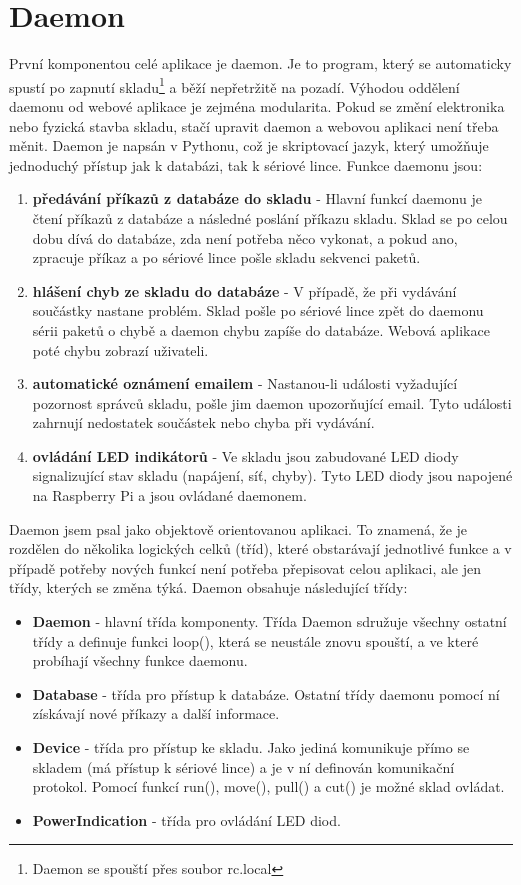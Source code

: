 \documentclass[12pt, a4paper, oneside]{article}
\begin{document}
\section{Daemon}

První komponentou celé aplikace je daemon. Je to program, který se automaticky spustí po zapnutí skladu\footnote{Daemon se spouští přes soubor rc.local} a běží nepřetržitě na pozadí. Výhodou oddělení daemonu od webové aplikace je zejména modularita. Pokud se změní elektronika nebo fyzická stavba skladu, stačí upravit daemon a webovou aplikaci není třeba měnit. Daemon je napsán v Pythonu, což je skriptovací jazyk, který umožňuje jednoduchý přístup jak k databázi, tak k sériové lince. Funkce daemonu jsou:

\begin{enumerate}
\item \textbf{předávání příkazů z databáze do skladu} - Hlavní funkcí daemonu je čtení příkazů z databáze a následné poslání příkazu skladu. Sklad se po celou dobu dívá do databáze, zda není potřeba něco vykonat, a pokud ano, zpracuje příkaz a po sériové lince pošle skladu sekvenci paketů.
\item \textbf{hlášení chyb ze skladu do databáze} - V případě, že při vydávání součástky nastane problém. Sklad pošle po sériové lince zpět do daemonu sérii paketů o chybě a daemon chybu zapíše do databáze. Webová aplikace poté chybu zobrazí uživateli.
\item \textbf{automatické oznámení emailem} - Nastanou-li události vyžadující pozornost správců skladu, pošle jim daemon upozorňující email. Tyto události zahrnují nedostatek součástek nebo chyba při vydávání.
\item \textbf{ovládání LED indikátorů} - Ve skladu jsou zabudované LED diody signalizující stav skladu (napájení, síť, chyby). Tyto LED diody jsou napojené na Raspberry Pi a jsou ovládané daemonem.
\end{enumerate}


Daemon jsem psal jako objektově orientovanou aplikaci. To znamená, že je rozdělen do několika logických celků (tříd), které obstarávají jednotlivé funkce a v případě potřeby nových funkcí není potřeba přepisovat celou aplikaci, ale jen třídy, kterých se změna týká. Daemon obsahuje následující třídy:

\begin{itemize}
\item \textbf{Daemon} - hlavní třída komponenty. Třída Daemon sdružuje všechny ostatní třídy a definuje funkci loop(), která se neustále znovu spouští, a ve které probíhají všechny funkce daemonu.
\item \textbf{Database} - třída pro přístup k databáze. Ostatní třídy daemonu pomocí ní získávají nové příkazy a další informace.
\item \textbf{Device} - třída pro přístup ke skladu. Jako jediná komunikuje přímo se skladem (má přístup k sériové lince) a je v ní definován komunikační protokol. Pomocí funkcí run(), move(), pull() a cut() je možné sklad ovládat.
\item \textbf{PowerIndication} - třída pro ovládání LED diod.
\end{itemize}
\end{document}
